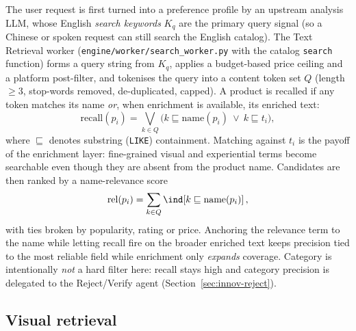 The user request is first turned into a preference profile by an upstream
analysis LLM, whose English \emph{search keywords} $K_q$ are the primary query
signal (so a Chinese or spoken request can still search the English catalog). The
Text Retrieval worker (\texttt{engine/worker/search\_worker.py} with the catalog
\texttt{search} function) forms a query string from $K_q$, applies a budget-based
price ceiling and a platform post-filter, and tokenises the query into a content
token set $Q$ (length $\geq 3$, stop-words removed, de-duplicated, capped). A
product is recalled if any token matches its name \emph{or}, when enrichment is
available, its enriched text:
\begin{equation}
  \mathrm{recall}(p_i)=\bigvee_{k\in Q}
  \big(k \sqsubseteq \mathrm{name}(p_i)\ \lor\ k \sqsubseteq t_i\big),
  \label{eq:text-recall}
\end{equation}
where $\sqsubseteq$ denotes substring (\texttt{LIKE}) containment. Matching
against $t_i$ is the payoff of the enrichment layer: fine-grained visual and
experiential terms become searchable even though they are absent from the product
name. Candidates are then ranked by a name-relevance score
\begin{equation}
  \mathrm{rel}(p_i)=\sum_{k\in Q}\ind\!\left[k\sqsubseteq\mathrm{name}(p_i)\right],
  \label{eq:rel}
\end{equation}
with ties broken by popularity, rating or price. Anchoring the relevance term to
the name while letting recall fire on the broader enriched text keeps precision
tied to the most reliable field while enrichment only \emph{expands} coverage.
Category is intentionally \emph{not} a hard filter here: recall stays high and
category precision is delegated to the Reject/Verify agent
(Section~\ref{sec:innov-reject}).

\subsection{Visual retrieval}
\label{sec:photo}

